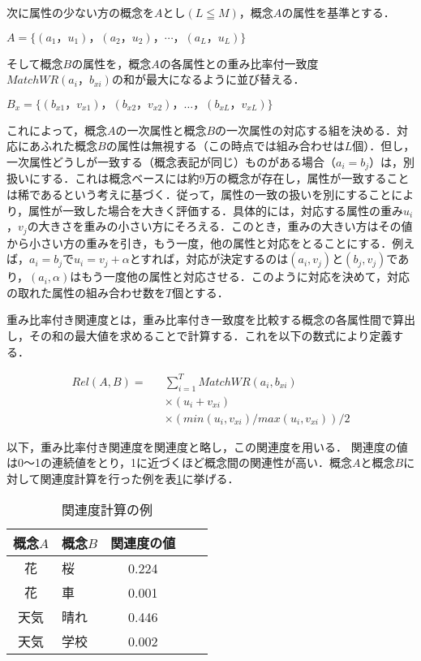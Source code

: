 次に属性の少ない方の概念を$A$とし$(L≦M)$，概念$A$の属性を基準とする．
	\begin{center}
	$A = \{ (a_1，u_1)，(a_2，u_2)，\cdots，(a_L，u_L)\} $
	\end{center}

そして概念$B$の属性を，概念$A$の各属性との重み比率付一致度$MatchWR(a_i，b_{xi})$の和が最大になるように並び替える．
	\begin{center}
	$B_x = \{ (b_{x1}，v_{x1})，(b_{x2}，v_{x2})，\dots，(b_{xL}，v_{xL})\} $
	\end{center}
これによって，概念$A$の一次属性と概念$B$の一次属性の対応する組を決める．対応にあふれた概念$B$の属性は無視する（この時点では組み合わせは$L$個）．但し，一次属性どうしが一致する（概念表記が同じ）ものがある場合（$a_i=b_j$）は，別扱いにする．これは概念ベースには約9万の概念が存在し，属性が一致することは稀であるという考えに基づく．従って，属性の一致の扱いを別にすることにより，属性が一致した場合を大きく評価する．具体的には，対応する属性の重み$u_i$，$v_j$の大きさを重みの小さい方にそろえる．このとき，重みの大きい方はその値から小さい方の重みを引き，もう一度，他の属性と対応をとることにする．例えば，$a_i=b_j$で$u_i=v_j+\alpha$とすれば，対応が決定するのは$(a_i,v_j)$と$(b_j,v_j)$であり，$(a_i,\alpha)$はもう一度他の属性と対応させる．このように対応を決めて，対応の取れた属性の組み合わせ数を$T$個とする．

重み比率付き関連度とは，重み比率付き一致度を比較する概念の各属性間で算出し，その和の最大値を求めることで計算する．これを以下の数式により定義する．

\begin{eqnarray}
Rel(A,B)=&&\sum_{i=1}^TMatchWR(a_i,b_{xi}) \\ \nonumber
&&\times (u_i+v_{xi}) \\ \nonumber
&&\times (min(u_i,v_{xi})/max(u_i,v_{xi}))/2 
\end{eqnarray}

以下，重み比率付き関連度を関連度と略し，この関連度\cite{idutsu2002}\cite{watabe2001}を用いる．
関連度の値は0〜1の連続値をとり，1に近づくほど概念間の関連性が高い．概念$A$と概念$B$に対して関連度計算を行った例を表\ref{tb:kanrendoExam}に挙げる．
\begin{table}[htbp]
    \begin{center}
      \caption{関連度計算の例}
      \label{tb:kanrendoExam}
      \begin{tabular}{clclc}
        \hline
        概念$A$ 	& 概念$B$ & 関連度の値\\
        \hline
        花 		& 桜	& 0.224 \\
        花 		& 車 	& 0.001\\
        天気	& 晴れ	& 0.446\\
        天気	& 学校	& 0.002\\
        \hline
      \end{tabular}
    \end{center}
\end{table}

